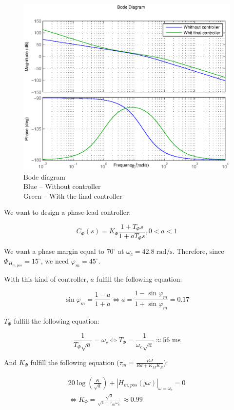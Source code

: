 \begin{center}
 \begin{figure}[ht]
 \includegraphics[width=\linewidth]{fig/bode_avance_phase.eps}
 \caption{Bode diagram \\ Blue -- Without controller \\ Green -- With the final controller}
 \label{bodePos2}
 \end{figure}
\end{center}


We want to design a phase-lead controller:

$$C_{\Phi}(s) = K_{\Phi} \frac{1 + T_{\Phi}s}{1 + a T_{\Phi} s}, 0 < a < 1$$ 

We want a phase margin equal to $70^{\circ}$ at $\omega_c = 42.8 \text{ rad/s}$. Therefore, since $\Phi_{H_{m,pos}} = 15^{\circ}$, we need $\varphi_m = 45^{\circ}$.

With this kind of controller, $a$ fulfill the following equation:

$$\sin\varphi_m = \frac{1-a}{1+a} \Leftrightarrow a = \frac{1 - \sin\varphi_m}{1 + \sin\varphi_m} = 0.17$$

$T_{\Phi}$ fulfill the following equation:

$$\frac{1}{T_{\Phi}\sqrt{a}} = \omega_c \Leftrightarrow T_{\Phi} = \frac{1}{\omega_c \sqrt{a}} \approx 56 \text{ ms}$$

And $K_{\Phi}$ fulfill the following equation ($\tau_m = \frac{RJ}{Rd+K_M K_E}$): 

\begin{multline*} 20 \log\left(\frac{K}{\sqrt{a}}\right) + |H_{m,pos}(j\omega)|_{\omega = \omega_c} = 0 \\ \Leftrightarrow K_{\Phi} = \frac{\sqrt{a}}{\sqrt{1 + \tau_m \omega_c}} \approx 0.99 \end{multline*}


